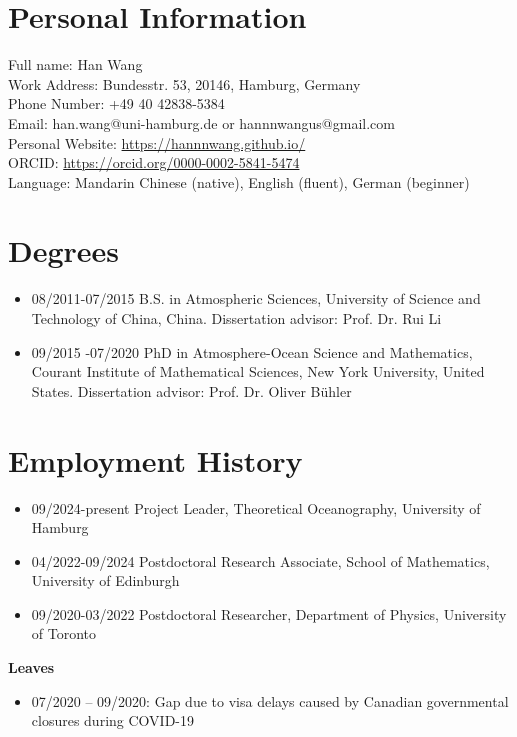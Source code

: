 \documentclass[a4paper,12pt]{article}
\begin{document}
\section{Personal Information}
Full name:  Han Wang\\
Work Address: Bundesstr. 53, 20146, Hamburg, Germany\\
Phone Number: +49 40 42838-5384 \\
Email: han.wang@uni-hamburg.de or hannnwangus@gmail.com\\
Personal Website: \url{https://hannnwang.github.io/}\\
ORCID: \url{https://orcid.org/0000-0002-5841-5474}\\
Language: Mandarin Chinese (native), English (fluent), German (beginner)

\section{Degrees}
\begin{itemize}[leftmargin=*,noitemsep]
\item 08/2011-07/2015  B.S. in Atmospheric Sciences, University of Science and Technology of China,
China. Dissertation advisor: Prof. Dr. Rui Li
\item 09/2015 -07/2020   PhD in Atmosphere-Ocean Science and Mathematics, Courant Institute of Mathematical Sciences, New York University, United States. Dissertation advisor: Prof. Dr. Oliver B{\"u}hler
\end{itemize}
\section{Employment History }
\begin{itemize}[leftmargin=*,noitemsep]
\item 09/2024-present  Project Leader, Theoretical Oceanography, University of Hamburg
\item 04/2022-09/2024  Postdoctoral Research Associate, School of Mathematics, University of Edinburgh
\item 09/2020-03/2022   Postdoctoral Researcher, Department of Physics, University of Toronto
\end{itemize}
\textbf{Leaves}
\begin{itemize}[leftmargin=*,noitemsep]
\item 07/2020 – 09/2020: Gap due to visa delays caused by Canadian governmental closures during COVID-19
\end{itemize}
\end{document}
